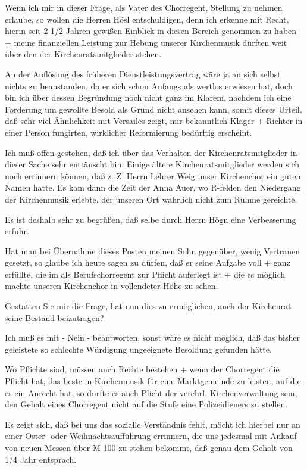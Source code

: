 \documentclass[12pt,a4pager]{book}
\begin{document}
Wenn ich mir in dieser Frage, als Vater des Chorregent, Stellung zu nehmen
erlaube, so wollen die Herren Hösl entschuldigen, denn ich erkenne mit Recht,
hierin seit 2 1/2 Jahren gewißen Einblick in diesen Bereich genommen zu haben +
meine finanziellen Leistung zur Hebung unserer Kirchenmusik dürften weit über
den der Kirchenratsmitglieder stehen.

An der Auflösung des früheren Dienstleistungsvertrag wäre ja an sich selbst
nichts zu beanstanden, da er sich schon Anfangs als wertlos erwiesen hat, doch
bin ich über dessen Begründung noch nicht ganz im Klarem, nachdem ich eine
Forderung um gewollte Besold als Grund nicht ansehen kann, somit dieses Urteil,
daß sehr viel Ähnlichkeit mit Versailes zeigt, mir bekanntlich Kläger + Richter
in einer Person fungirten, wirklicher Reformierung bedürftig erscheint.

Ich muß offen gestehen, daß ich über das Verhalten der Kirchenratsmitglieder in
dieser Sache sehr enttäuscht bin. Einige ältere Kirchenratsmitglieder werden
sich noch errinnern können, daß z. Z. Herrn Lehrer Weig unser Kirchenchor ein
guten Namen hatte. Es kam dann die Zeit der Anna Auer, wo R-felden den
Niedergang der Kirchenmusik erlebte, der unseren Ort wahrlich nicht zum Ruhme
gereichte.

Es ist deshalb sehr zu begrüßen, daß selbe durch Herrn Högn eine Verbesserung
erfuhr.

Hat man bei Übernahme dieses Posten meinen Sohn gegenüber, wenig Vertrauen
gesetzt, so glaube ich heute sagen zu dürfen, daß er seine Aufgabe voll + ganz
erfüllte, die im als Berufschorregent zur Pflicht auferlegt ist + die es möglich
machte unseren Kirchenchor in vollendeter Höhe zu sehen.

Gestatten Sie mir die Frage, hat nun dies zu ermöglichen, auch der Kirchenrat
seine Bestand beizutragen?

Ich muß es mit - Nein - beantworten, sonst wäre es nicht möglich, daß das bisher
geleistete so schlechte Würdigung ungeeignete Besoldung gefunden hätte.

Wo Pflichte sind, müssen auch Rechte bestehen + wenn der Chorregent die Pflicht
hat, das beste in Kirchenmusik für eine Marktgemeinde zu leisten, auf die es ein
Anrecht hat, so dürfte es auch Plicht der verehrl. Kirchenverwaltung sein, den
Gehalt eines Chorregent nicht auf die Stufe eine Polizeidieners zu stellen.

Es zeigt sich, daß bei uns das sozialle Verständnis fehlt, möcht ich hierbei nur
an einer Oster- oder Weihnachtsaufführung errinnern, die uns jedesmal mit Ankauf
von neuen Messen über M 100 zu stehen bekommt, daß genau dem Gehalt von 1/4 Jahr
entsprach.
\end{document}
